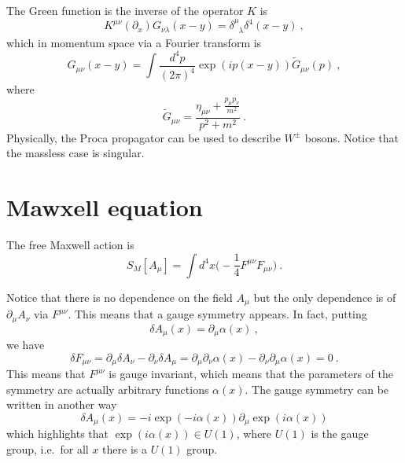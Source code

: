     The Green function is the inverse of the operator $K$ is 
    \begin{equation}\label{inv}
        K^{\mu\nu} (\partial_x) G_{\nu\lambda} (x-y) = \delta^\mu_{\phantom \mu \lambda} \delta^4 (x-y) ~,
    \end{equation}
    which in momentum space via a Fourier transform is 
    \begin{equation*}
        G_{\mu\nu} (x-y) = \int \frac{d^4 p}{(2\pi)^4} \exp(i p (x-y)) \tilde G_{\mu\nu} (p) ~,
    \end{equation*}
    where 
    \begin{equation*}
        \tilde G_{\mu\nu} = \frac{\eta_{\mu\nu} + \frac{p_\mu p_\nu}{m^2}}{p^2 + m^2} ~.
    \end{equation*}
    Physically, the Proca propagator can be used to describe $W^\pm$ bosons. Notice that the massless case is singular.

\section{Mawxell equation}

    The free Maxwell action is 
    \begin{equation*}
        S_M [A_\mu] = \int d^4 x \Big (- \frac{1}{4} F^{\mu\nu} F_{\mu\nu} \Big) ~.
    \end{equation*} 

    Notice that there is no dependence on the field $A_\mu$ but the only dependence is of $\partial_\mu A_\nu$ via $F^{\mu\nu}$. This means that a gauge symmetry appears. In fact, putting 
    \begin{equation*}
        \delta A_\mu (x) = \partial_\mu \alpha(x) ~,
    \end{equation*}
    we have 
    \begin{equation*}
        \delta F_{\mu\nu} = \partial_\mu \delta A_\nu - \partial_\nu \delta A_\mu = \partial_\mu \partial_\nu \alpha (x) - \partial_\nu \partial_\mu \alpha (x) = 0 ~.
    \end{equation*}
    This means that $F^{\mu\nu}$ is gauge invariant, which means that the parameters of the symmetry are actually arbitrary functions $\alpha (x)$. The gauge symmetry can be written in another way 
    \begin{equation*}
        \delta A_\mu (x) = - i \exp(-i \alpha(x)) \partial_\mu \exp(i \alpha (x))
    \end{equation*}
    which highlights that $\exp(i \alpha(x)) \in U(1)$, where $U(1)$ is the gauge group, i.e.~for all $x$ there is a $U(1)$ group.

